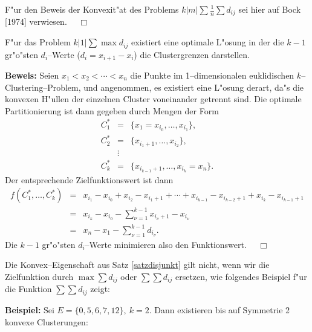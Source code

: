 F"ur den Beweis der Konvexit"at des Problems $k|m|\sum \frac 1n 
\sum d_{ij}$  sei hier auf Bock [1974] verwiesen.
$\quad\Box$
\vspace*{0.5cm}

\begin{satz}
F"ur das Problem $k|1|\sum\max d_{ij}$ existiert eine
optimale L"osung in der die $k-1$ gr"o"sten $d_i$--Werte
($d_i = x_{i+1} - x_i$) die Clustergrenzen darstellen.
\end{satz}
{\bf Beweis:}
Seien $x_1 < x_2 < \cdots < x_n$ die Punkte im 1--dimensionalen
euklidischen $k$--Clustering--Problem, und angenommen, es existiert eine
L"osung derart, da"s die konvexen H"ullen der einzelnen Cluster
voneinander getrennt sind.
Die optimale Partitionierung ist dann gegeben durch Mengen der Form
\begin{eqnarray*}
	C_1^* & = & \{x_1=x_{i_0},\dots,x_{i_1}\},\\
	C_2^* & = & \{x_{i_1 +1},\dots,x_{i_2}\},\\
	      & \vdots & \\
	C_k^* & = & \{x_{i_{k-1}+1},\dots,x_{i_k}=x_n\}.
\end{eqnarray*}
Der entsprechende Zielfunktionswert ist dann
\begin{eqnarray*}
	f(C_1^*,\dots,C_k^*) 
	 	& = & x_{i_1} - x_{i_0} + x_{i_2} - x_{i_1+1}+
		 	\cdots + x_{i_{k-1}} - x_{i_{k-2}+1} + x_{i_k} - x_{i_{k-1}+1}\\
		& = & x_{i_k} - x_{i_0} - \sum_{\nu = 1}^{k-1} x_{i_\nu +1} 
			- x_{i_\nu}\\
		& = & x_n - x_1 - \sum_{\nu = 1}^{k-1} d_{i_\nu}.
\end{eqnarray*}
Die $k-1$ gr"o"sten $d_i$--Werte minimieren also den Funktionswert.
$\quad\Box$
\vspace*{0.5cm}


Die Konvex--Eigenschaft aus Satz \ref{satzdisjunkt} gilt nicht, 
wenn wir die Zielfunktion durch $\max \sum d_{ij}$ oder $\sum \sum d_{ij}$
ersetzen, wie folgendes Beispiel f"ur die Funktion $\sum \sum d_{ij}$
zeigt:

{\bf Beispiel:}
Sei $E=\{0,5,6,7,12\}, \ k=2$. Dann existieren bis auf Symmetrie 2 konvexe
Clusterungen:
\vspace*{3mm}





